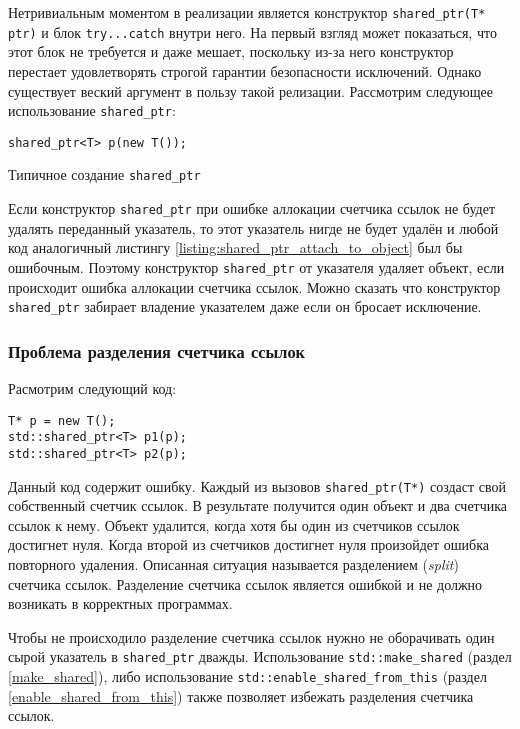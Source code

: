 Нетривиальным моментом в реализации является конструктор \texttt{shared_ptr(T* ptr)} и блок \texttt{try...catch} внутри него. На первый взгляд может показаться, что этот блок не требуется и даже мешает, поскольку из-за него конструктор перестает удовлетворять строгой гарантии безопасности исключений. Однако существует веский аргумент в пользу такой релизации. Рассмотрим следующее использование \texttt{shared_ptr}:

\begin{listing}
\begin{verbatim}
shared_ptr<T> p(new T());
\end{verbatim}
\caption{Типичное создание \texttt{shared_ptr}}
\label{listing:shared_ptr_attach_to_object}
\end{listing}

Если конструктор \texttt{shared_ptr} при ошибке аллокации счетчика ссылок не будет удалять переданный указатель, то этот указатель нигде не будет удалён и любой код аналогичный листингу \ref{listing:shared_ptr_attach_to_object} был бы ошибочным. Поэтому конструктор \texttt{shared_ptr} от указателя удаляет объект, если происходит ошибка аллокации счетчика ссылок. Можно сказать что конструктор \texttt{shared_ptr} забирает владение указателем даже если он бросает исключение.

\subsubsection{Проблема разделения счетчика ссылок}
\label{reference_counter_split_problem}

Расмотрим следующий код:
\begin{verbatim}
T* p = new T();
std::shared_ptr<T> p1(p);
std::shared_ptr<T> p2(p);
\end{verbatim}
Данный код содержит ошибку. Каждый из вызовов \texttt{shared_ptr(T*)} создаст свой собственный счетчик ссылок. В результате получится один объект и два счетчика ссылок к нему. Объект удалится, когда хотя бы один из счетчиков ссылок достигнет нуля. Когда второй из счетчиков достигнет нуля произойдет ошибка повторного удаления. Описанная ситуация называется разделением ({\it split}) счетчика ссылок. Разделение счетчика ссылок является ошибкой и не должно возникать в корректных программах.

Чтобы не происходило разделение счетчика ссылок нужно не оборачивать один сырой указатель в \texttt{shared_ptr} дважды. Использование \texttt{std::make_shared} (раздел \ref{make_shared}), либо использование \texttt{std::enable_shared_from_this} (раздел \ref{enable_shared_from_this}) также позволяет избежать разделения счетчика ссылок.

